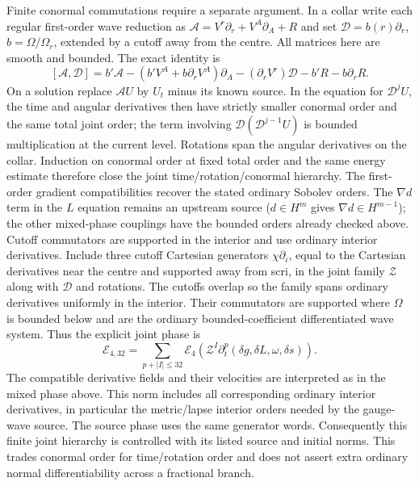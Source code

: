 Finite conormal commutations require a separate argument.  In a collar
write each regular first-order wave reduction as
$\mathcal A=V^r\partial_r+V^A\partial_A+R$ and set
$\mathcal D=b(r)\partial_r$, $b=\Omega/\Omega_r$, extended by a cutoff
away from the centre.  All matrices here are smooth and bounded.  The exact
identity is
\[
 [\mathcal A,\mathcal D]=b'\mathcal A
 -(b'V^A+b\partial_rV^A)\partial_A
 -(\partial_rV^r)\mathcal D-b'R-b\partial_rR.
\]
On a solution replace $\mathcal AU$ by $U_t$ minus its known source.
In the equation for $\mathcal D^jU$, the time and angular derivatives then
have strictly smaller conormal order and the same total joint order; the
term involving $\mathcal D(\mathcal D^{j-1}U)$ is bounded multiplication at
the current level.  Rotations span the angular derivatives on the collar.
Induction on conormal order at fixed total order and the same energy estimate
therefore close the joint time/rotation/conormal hierarchy.  The first-order
gradient compatibilities recover the stated ordinary Sobolev orders.
The $\nabla d$ term in the $L$ equation remains an upstream source
($d\in H^m$ gives $\nabla d\in H^{m-1}$); the other mixed-phase couplings
have the bounded orders already checked above.  Cutoff commutators are
supported in the interior and use ordinary interior derivatives.
Include three cutoff Cartesian generators $\chi\partial_i$, equal to the
Cartesian derivatives near the centre and supported away from scri, in the
joint family $\mathcal Z$ along with $\mathcal D$ and rotations.  The cutoffs
overlap so the family spans ordinary derivatives uniformly in the interior.
Their commutators are supported where $\Omega$ is bounded below and are the
ordinary bounded-coefficient differentiated wave system.  Thus the explicit
joint phase is
\[
 \mathcal E_{4,32}
   =\sum_{p+|I|\le32}\mathcal E_4
           (\mathcal Z^I\partial_t^p(\delta g,\delta L,\omega,\delta s)).
\]
The compatible derivative fields and their velocities are interpreted as in
the mixed phase above.  This norm includes all corresponding ordinary
interior derivatives, in particular the metric/lapse interior orders needed
by the gauge-wave source.  The source phase uses the same generator words.
Consequently this finite joint hierarchy is controlled with its listed
source and initial norms.  This trades
conormal order for time/rotation order and does not assert extra ordinary
normal differentiability across a fractional branch.

